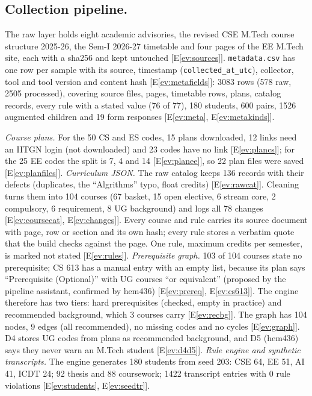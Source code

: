 \documentclass[11pt,a4paper]{article}
\newcounter{ev}
\newcommand{\ev}[1]{E\ref{ev:#1}}
\newcommand{\nforms}{19}
\newcommand{\nmeta}{3083}
\newcommand{\nmetaraw}{578}
\newcommand{\nmetaproc}{2505}
\begin{document}
\subsection{Collection pipeline.}
The raw layer holds eight academic advisories, the revised CSE M.Tech course structure 2025-26, the Sem-I 2026-27
timetable and four pages of the EE M.Tech site, each with a sha256 and kept untouched [\ev{sources}].
\texttt{metadata.csv} has one row per sample with its source, timestamp (\texttt{collected\_at\_utc}), collector,
tool and tool version and content hash [\ev{metafields}]: \nmeta{} rows (\nmetaraw{} raw, \nmetaproc{} processed),
covering source files, pages, timetable rows, plans, catalog records, every rule with a stated value (76 of 77),
180 students, 600 pairs, 1526 augmented children and \nforms{} form responses [\ev{meta}, \ev{metakinds}].

\emph{Course plans.} For the 50 CS and ES codes, 15 plans downloaded, 12 links need an IITGN login (not
downloaded) and 23 codes have no link [\ev{plancs}]; for the 25 EE codes the split is 7, 4 and 14 [\ev{planee}],
so 22 plan files were saved [\ev{planfiles}].
\emph{Curriculum JSON.} The raw catalog keeps 136 records with their defects (duplicates, the ``Algrithms'' typo,
float credits) [\ev{rawcat}]. Cleaning turns them into 104 courses (67 basket, 15 open elective, 6 stream core,
2 compulsory, 6 requirement, 8 UG background) and logs all 78 changes [\ev{coursecat}, \ev{changes}]. Every course
and rule carries its source document with page, row or section and its own hash; every rule stores a verbatim quote
that the build checks against the page. One rule, maximum credits per semester, is marked not stated [\ev{rules}].
\emph{Prerequisite graph.} 103 of 104 courses state no prerequisite; CS 613 has a manual entry with an empty list,
because its plan says ``Prerequisite (Optional)'' with UG courses ``or equivalent'' (proposed by the pipeline
assistant, confirmed by hem436) [\ev{prereq}, \ev{cs613}]. The engine therefore has two tiers: hard prerequisites
(checked, empty in practice) and recommended background, which 3 courses carry [\ev{recbg}]. The graph has 104 nodes,
9 edges (all recommended), no missing codes and no cycles [\ev{graph}]. D4 stores UG codes from plans as recommended
background, and D5 (hem436) says they never warn an M.Tech student [\ev{d4d5}].
\emph{Rule engine and synthetic transcripts.} The engine generates 180 students from seed 203: CSE 64, EE 51, AI 41,
ICDT 24; 92 thesis and 88 coursework; 1422 transcript entries with 0 rule violations [\ev{students}, \ev{seedtr}].
\end{document}
